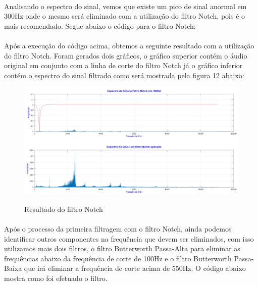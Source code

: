 \documentclass[12pt,fleqn]{article}
\begin{document}
\paragraph{} Analisando o espectro do sinal, vemos que existe um pico de sinal anormal em 300Hz onde o mesmo será eliminado com a utilização do filtro Notch, pois é o mais recomendado. Segue abaixo o código para o filtro Notch:


\newpage
\paragraph{} Após a execução do código acima, obtemos a seguinte resultado com a utilização do filtro Notch. Foram gerados dois gráficos, o gráfico superior contém o áudio original em conjunto com a linha de corte do filtro Notch já o gráfico inferior contém o espectro do sinal filtrado como será mostrada pela figura 12 abaixo:

\begin{figure}[!htb]
    \centering
    \includegraphics[scale=0.4]{fig/sinal2.png}
    \label{figura:figura8}
    \caption{Resultado do filtro Notch}
\end{figure}

\paragraph{} Após o processo da primeira filtragem com o filtro Notch, ainda podemos identificar outros componentes na frequência que devem ser eliminados, com isso utilizamos mais dois filtros, o filtro Butterworth Passa-Alta para eliminar as frequências abaixo da frequência de corte de 100Hz e o filtro Butterworth Passa-Baixa que irá eliminar a frequência de corte acima de 550Hz. O código abaixo mostra como foi efetuado o filtro.
\end{document}
